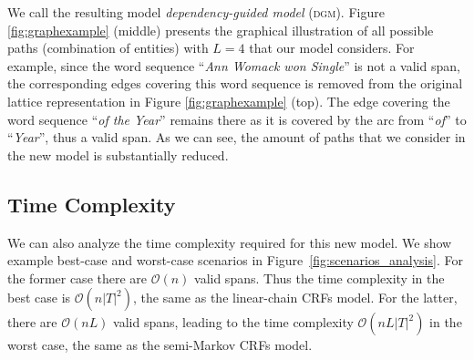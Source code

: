We call the resulting model {\em dependency-guided model} (\textsc{dgm}).
Figure \ref{fig:graphexample} (middle) presents the graphical illustration of all possible paths (combination of entities) with $L=4$ that our model considers.
For example, since the word sequence ``{\em Ann Womack won Single}'' is not a valid span, the corresponding edges covering this word sequence is removed from the original lattice representation in Figure \ref{fig:graphexample} (top).
The edge covering the word sequence ``{\em of the Year}'' remains there as it is covered by the arc from ``{\em of}'' to ``{\em Year}'', thus a valid span.
As we can see, the amount of paths that we consider in the new model is substantially reduced.

\subsection{Time Complexity}
We can also analyze the time complexity required for this new model. We show example best-case and worst-case scenarios in Figure~\ref{fig:scenarios_analysis}.
For the former case there are $\mathcal{O} (n)$ valid spans. Thus the time complexity in the best case is $\mathcal{O} (n|T|^2)$, the same as the linear-chain CRFs model.
For the latter, there are $\mathcal{O} (nL)$ valid spans, leading to the time complexity $\mathcal{O} (nL|T|^2)$ in the worst case, the same as the semi-Markov CRFs model.

